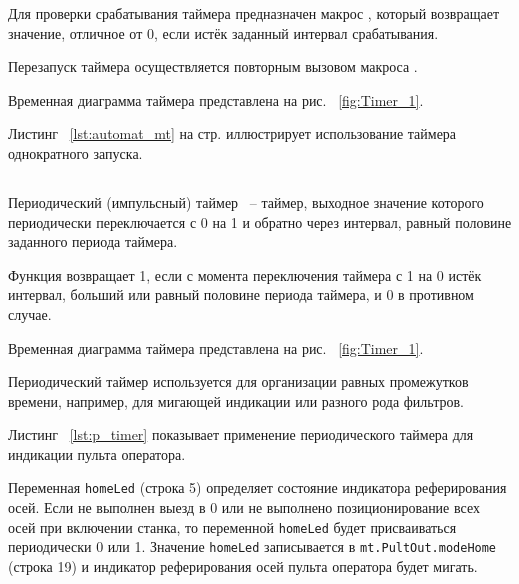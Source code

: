 Для проверки срабатывания таймера предназначен макрос , который возвращает значение, отличное от 0, если истёк заданный интервал срабатывания.

Перезапуск таймера осуществляется повторным вызовом макроса .

Временная диаграмма таймера представлена на рис. ~\ref{fig:Timer_1}.


Листинг ~\ref{lst:automat_mt} на стр. \pageref{lst:automat_mt} иллюстрирует использование таймера однократного запуска.


\subsection{}

Периодический (импульсный) таймер ~-- таймер, выходное значение которого периодически переключается с 0 на 1 и обратно через интервал, равный половине заданного периода таймера.

Функция  возвращает 1, если с момента переключения таймера с 1 на 0 истёк интервал, больший или равный половине периода таймера, и 0 в противном случае. 

Временная диаграмма таймера представлена на рис. ~\ref{fig:Timer_1}.


Периодический таймер используется для организации равных промежутков времени, например, для мигающей индикации или разного рода фильтров.

Листинг ~\ref{lst:p_timer} показывает применение периодического таймера для индикации пульта оператора.\killoverfullbefore 

Переменная \texttt{homeLed} (строка 5) определяет состояние индикатора реферирования осей. Если не выполнен выезд в 0 или не выполнено позиционирование всех осей при включении станка, то переменной \texttt{homeLed} будет присваиваться периодически 0 или 1. Значение \texttt{homeLed} записывается в \texttt{mt.PultOut.modeHome} (строка 19) и индикатор реферирования осей пульта оператора будет мигать. \killoverfullbefore \BL

